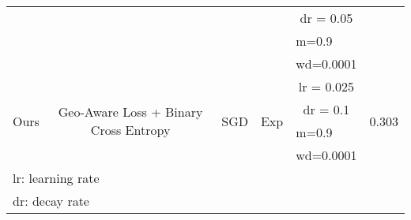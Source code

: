 \documentclass{article}
\begin{document}
\begin{table}[tbh]
\begin{adjustbox}{max width=\textwidth}
\begin{tabular}{cccccl}
\multicolumn{1}{|c|}{}                        & \multicolumn{1}{c|}{}                             & \multicolumn{1}{c|}{}                     & \multicolumn{1}{c|}{}                      & \multicolumn{1}{c|}{dr = 0.05}  & \multicolumn{1}{l|}{}                       \\ \cline{5-5}
\multicolumn{1}{|c|}{}                        & \multicolumn{1}{c|}{}                             & \multicolumn{1}{c|}{}                     & \multicolumn{1}{c|}{}                      & \multicolumn{1}{l|}{m=0.9}      & \multicolumn{1}{l|}{}                       \\ \cline{5-5}
\multicolumn{1}{|c|}{}                        & \multicolumn{1}{c|}{}                             & \multicolumn{1}{c|}{}                     & \multicolumn{1}{c|}{}                      & \multicolumn{1}{l|}{wd=0.0001}  & \multicolumn{1}{l|}{}                       \\ \hline
\multicolumn{1}{|c|}{\multirow{4}{*}{Ours}} & \multicolumn{1}{c|}{\multirow{4}{*}{Geo-Aware Loss + Binary Cross Entropy}} & \multicolumn{1}{c|}{\multirow{4}{*}{SGD}} & \multicolumn{1}{c|}{\multirow{4}{*}{Exp}}  & \multicolumn{1}{c|}{lr = 0.025}  & \multicolumn{1}{l|}{\multirow{4}{*}{0.303}} \\ \cline{5-5}
\multicolumn{1}{|c|}{}                        & \multicolumn{1}{c|}{}                             & \multicolumn{1}{c|}{}                     & \multicolumn{1}{c|}{}                      & \multicolumn{1}{c|}{dr = 0.1}   & \multicolumn{1}{l|}{}                       \\ \cline{5-5}
\multicolumn{1}{|c|}{}                        & \multicolumn{1}{c|}{}                             & \multicolumn{1}{c|}{}                     & \multicolumn{1}{c|}{}                      & \multicolumn{1}{l|}{m=0.9}      & \multicolumn{1}{l|}{}                       \\ \cline{5-5}
\multicolumn{1}{|c|}{}                        & \multicolumn{1}{c|}{}                             & \multicolumn{1}{c|}{}                     & \multicolumn{1}{c|}{}                      & \multicolumn{1}{l|}{wd=0.0001}  & \multicolumn{1}{l|}{}                       \\ \hline
\multicolumn{6}{l}{lr: learning rate}                                                                                                                                                                                                                                      \\
\multicolumn{6}{l}{dr: decay rate}                                                                                                                                                                                                                                         \\

\end{tabular}
\end{adjustbox}
\end{table}
\end{document}
